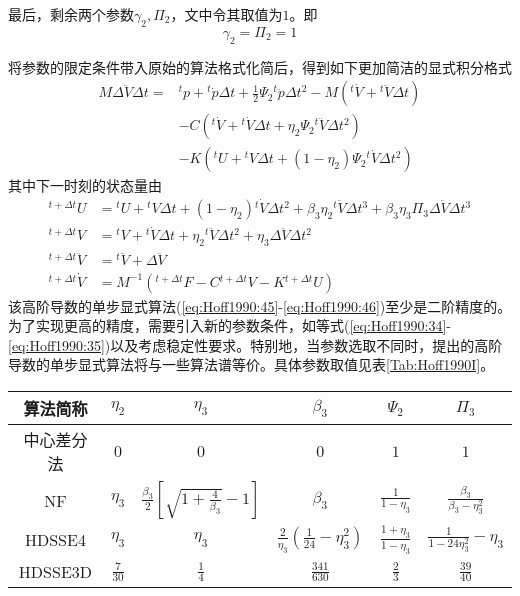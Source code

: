 最后，剩余两个参数$\gamma_2,\Pi_2$，文中令其取值为$1$。即
\begin{equation}
\gamma_2=\Pi_2=1
\end{equation}

将参数的限定条件带入原始的算法格式化简后，得到如下更加简洁的显式积分格式
\begin{equation}
\begin{aligned}
M\Delta\ddot{V}\Delta t=&{^t\!p}+{^t\!\dot{p}}\Delta t+\frac12\Psi_2{^t\!\ddot{p}}\Delta t^2-M({^t\!\dot{V}}+{^t\!\ddot{V}}\Delta t)\\
&-C({^t\!\dot{V}}+{^t\!\dot{V}}\Delta t+\eta_2\Psi_2{^t\!\ddot{V}}\Delta t^2)\\
&-K({^t\!U}+{^t\!V}\Delta t+(1-\eta_2)\Psi_2{^t\!\dot{V}}\Delta t^2)
\end{aligned}\label{eq:Hoff1990:45}
\end{equation}
其中下一时刻的状态量由
\begin{subequations}
\begin{align}
{^{t+\Delta t}\!U}&={^t\!U}+{^t\!{V}}\Delta t+(1-\eta_2){^t\!\dot{V}}\Delta t^2+\beta_3\eta_2{^t\!\ddot{V}}\Delta t^3+\beta_3\eta_3\Pi_3\Delta\ddot{V}\Delta t^3\\
{^{t+\Delta t}\!V}&={^t\!V}+{^{t}\!\dot{V}}\Delta t+\eta_2{^t\!\ddot{V}}\Delta t^2+\eta_3\Delta\ddot{V}\Delta t^2\\
{^{t+\Delta t}\!\ddot{V}}&={^t\!\ddot{V}}+\Delta\ddot{V}\\
{^{t+\Delta t}\!\dot{V}}&=M^{-1}({^{t+\Delta t}\!F}-C{^{t+\Delta t}\!V}-K{^{t+\Delta t}\!U})
\end{align}\label{eq:Hoff1990:46}
\end{subequations}
该高阶导数的单步显式算法(\ref{eq:Hoff1990:45}-\ref{eq:Hoff1990:46})至少是二阶精度的。为了实现更高的精度，需要引入新的参数条件，如等式(\ref{eq:Hoff1990:34}-\ref{eq:Hoff1990:35})以及考虑稳定性要求。特别地，当参数选取不同时，提出的高阶导数的单步显式算法将与一些算法谱等价。具体参数取值见表\ref{Tab:Hoff1990I}。
\vspace{-0.4cm}
\begin{table}[htbp]
\vspace{0.5em}\centering\wuhao
\begin{tabular}{cccccc}
\toprule[1.5pt]
算法简称&$\eta_2$& $\eta_3$ & $\beta_3$ & $\Psi_2$ & $\Pi_3$ \\
\midrule[1pt]
中心差分法 & $0$ & $0$ & $0$ & $1$ & $1$ \\
NF\cite{Kujawski1984} & $\eta_3$ & $\frac{\beta_3}{2}[\sqrt{1+\frac{4}{\beta_3}}-1]$ & $\beta_3$ & $\frac{1}{1-\eta_3}$ & $\frac{\beta_3}{\beta_3-\eta_3^2}$\\
HDSSE4 & $\eta_3$ & $\eta_3$ & $\frac{2}{\eta_3}(\frac{1}{24}-\eta_3^2)$ & $\frac{1+\eta_3}{1-\eta_3}$ & $\frac{1}{1-24\eta_3^2}-\eta_3$\\
HDSSE3D & $\frac{7}{30}$ & $\frac{1}{4}$ & $\frac{341}{630}$ & $\frac23$ & $\frac{39}{40}$\\
\bottomrule[1.5pt]
\end{tabular}
\end{table}

